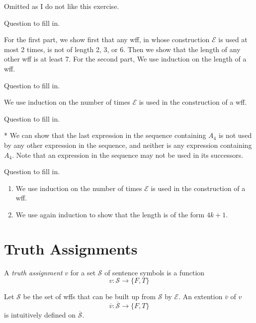 Omitted as I do not like this exercise.

\begin{exercise}
  Question to fill in.
\end{exercise}

For the first part, we show first that any wff, in whose construction $\mathcal{E}$ is used at most 2 times, is not of length 2, 3, or 6. Then we show that the length of any other wff is at least 7. For the second part, We use induction on the length of a wff.

\begin{exercise}
  Question to fill in.
\end{exercise}

We use induction on the number of times $\mathcal{E}$ is used in the construction of a wff.

\begin{exercise}
  Question to fill in.
\end{exercise}

* We can show that the last expression in the sequence containing $A_4$ is not used by any other expression in the sequence, and neither is any expression containing $A_4$. Note that an expression in the sequence may not be used in its successors.

\begin{exercise}
  Question to fill in.
\end{exercise}

\begin{enumerate}
  \item We use induction on the number of times $\mathcal{E}$ is used in the construction of a wff.
  \item We use again induction to show that the length is of the form $4k+1$.
\end{enumerate}

\section{Truth Assignments}

A \textit{truth assignment} $v$ for a set $\mathcal{S}$ of sentence symbols is a function
\[
  v:\mathcal{S}\rightarrow\{F,T\}
\]

Let $\mathcal{S}$ be the set of wffs that can be built up from $\mathcal{S}$ by $\mathcal{E}$. An extention $\overline{v}$ of $v$
\[
  \overline{v}:\overline{\mathcal{S}}\rightarrow\{F,T\}
\]
is intuitively defined on $\overline{\mathcal{S}}$.

